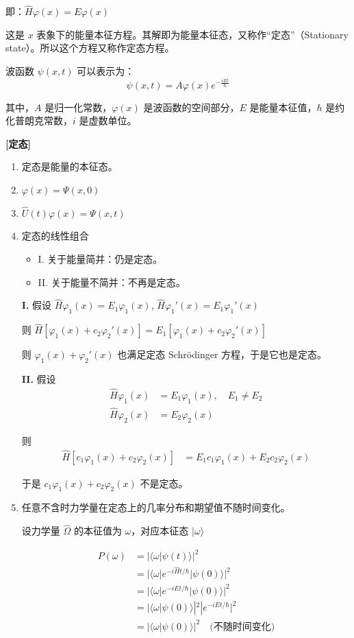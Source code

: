 \documentclass[lang=cn,10pt]{elegantbook}
\begin{document}
即：\(\hat{H} \varphi(x) = E \varphi(x)\)

这是 \(x\) 表象下的能量本征方程。其解即为能量本征态，又称作“定态”（Stationary state）。所以这个方程又称作定态方程。

波函数 \(\psi(x, t)\) 可以表示为：
\[ \psi(x, t) = A \varphi(x) e^{-\frac{iEt}{\hbar}} \]

其中，\(A\) 是归一化常数，\(\varphi(x)\) 是波函数的空间部分，\(E\) 是能量本征值，\(\hbar\) 是约化普朗克常数，\(i\) 是虚数单位。

\textbf{[定态]}
\begin{enumerate}
	\item 定态是能量的本征态。
	\item \(\varphi(x) = \Psi(x, 0)\)
	\item \(\hat{U}(t) \varphi(x) = \Psi(x, t)\)
	\item 定态的线性组合
	\begin{itemize}
		\item I. 关于能量简并：仍是定态。
		\item II. 关于能量不简并：不再是定态。
	\end{itemize}




\textbf{I.} 假设 \(\hat{H} \varphi_1(x) = E_1 \varphi_1(x)\), \(\hat{H} \varphi_1'(x) = E_1 \varphi_1'(x)\)

则 \(\hat{H} [\varphi_1(x) + c_2 \varphi_2'(x)] = E_1 [\varphi_1(x) + c_2 \varphi_2'(x)]\)

则 \(\varphi_1(x) + \varphi_2'(x)\) 也满足定态 Schrödinger 方程，于是它也是定态。

\textbf{II.} 假设
\begin{align*}
	\hat{H} \varphi_1(x) &= E_1 \varphi_1(x), \quad E_1 \neq E_2 \\
	\hat{H} \varphi_2(x) &= E_2 \varphi_2(x)
\end{align*}

则
\begin{align*}
	\hat{H} [c_1 \varphi_1(x) + c_2 \varphi_2(x)] &= E_1 c_1 \varphi_1(x) + E_2 c_2 \varphi_2(x)
\end{align*}

于是 \(c_1 \varphi_1(x) + c_2 \varphi_2(x)\) 不是定态。

	\item 任意不含时力学量在定态上的几率分布和期望值不随时间变化。
	
	设力学量 $\hat{\Omega}$ 的本征值为 $\omega$，对应本征态 $|\omega\rangle$
	
	\begin{align*}
		P(\omega) &= |\langle \omega | \psi(t) \rangle|^2 \\
		&= |\langle \omega | e^{-i\hat{H}t/\hbar} | \psi(0) \rangle|^2 \\
		&= |\langle \omega | e^{-iEt/\hbar} | \psi(0) \rangle|^2 \\
		&= |\langle \omega | \psi(0) \rangle|^2 |e^{-iEt/\hbar}|^2 \\
		&= |\langle \omega | \psi(0) \rangle|^2 \quad \text{(不随时间变化)}
	\end{align*}
	

\end{enumerate}
\end{document}

